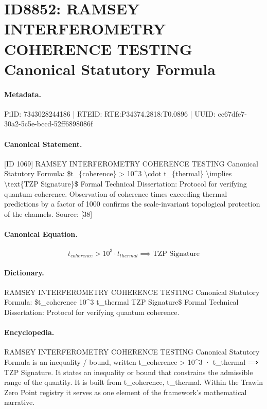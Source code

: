 \section*{ID8852: RAMSEY INTERFEROMETRY COHERENCE TESTING Canonical Statutory Formula}
\paragraph{Metadata.}
PiID: 7343028244186 | RTEID: RTE:P34374.2818:T0.0896 | UUID: cc67dfe7-30a2-5c5e-bccd-52ff6898086f

\paragraph{Canonical Statement.}
[ID 1069] RAMSEY INTERFEROMETRY COHERENCE TESTING Canonical Statutory Formula: \$t\_\{coherence\} > 10\textasciicircum{}3 \textbackslash{}cdot t\_\{thermal\} \textbackslash{}implies \textbackslash{}text\{TZP Signature\}\$ Formal Technical Dissertation: Protocol for verifying quantum coherence. Observation of coherence times exceeding thermal predictions by a factor of 1000 confirms the scale-invariant topological protection of the channels. Source: [38]

\paragraph{Canonical Equation.}
\[
t_{coherence} > 10^3 \cdot t_{thermal} \implies \text{TZP Signature}
\]

\paragraph{Dictionary.}
RAMSEY INTERFEROMETRY COHERENCE TESTING Canonical Statutory Formula: \$t\_coherence 10\textasciicircum{}3 t\_thermal TZP Signature\$ Formal Technical Dissertation: Protocol for verifying quantum coherence.

\paragraph{Encyclopedia.}
RAMSEY INTERFEROMETRY COHERENCE TESTING Canonical Statutory Formula is an inequality / bound, written t\_coherence > 10\textasciicircum{}3 · t\_thermal ⟹ TZP Signature. It states an inequality or bound that constrains the admissible range of the quantity. It is built from t\_coherence, t\_thermal. Within the Trawin Zero Point registry it serves as one element of the framework's mathematical narrative.
